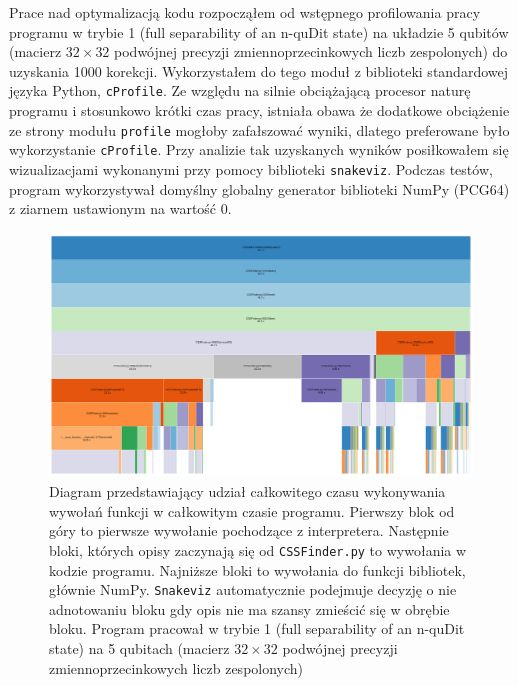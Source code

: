 \documentclass[10pt, a4paper]{article}
\newcommand{\code}[1]{\texttt{#1}}
\begin{document}
\begin{sloppypar}
    Prace nad optymalizacją kodu rozpocząłem od wstępnego profilowania pracy programu w trybie
    1 (full separability of an n-quDit state) na układzie 5 qubitów (macierz
    $32\times 32$ podwójnej precyzji zmiennoprzecinkowych liczb zespolonych) do uzyskania
    1000 korekcji. Wykorzystałem do tego moduł z biblioteki standardowej języka Python, \code{cProfile}.
    Ze względu na silnie obciążającą procesor naturę programu i stosunkowo krótki czas pracy,
    istniała obawa że dodatkowe obciążenie ze strony modułu \code{profile} mogłoby zafałszować
    wyniki, dlatego preferowane było wykorzystanie \code{cProfile}. Przy analizie tak
    uzyskanych wyników posiłkowałem się wizualizacjami wykonanymi przy pomocy biblioteki
    \code{snakeviz}\cite{Snakeviz_PyPI}. Podczas testów, program wykorzystywał domyślny
    globalny generator biblioteki NumPy (PCG64\cite{NumpyDefaultGenerator}) z ziarnem ustawionym
    na wartość 0.

    \FloatBarrier
    \begin{figure}[h]
      \centering
      \includegraphics[width=1.0\textwidth]{"resources/profiling_1/graph.png"}
      \caption{Diagram przedstawiający udział całkowitego czasu wykonywania wywołań funkcji w całkowitym czasie programu. Pierwszy blok od góry to pierwsze wywołanie pochodzące z interpretera. Następnie bloki, których opisy zaczynają się od \code{CSSFinder.py} to wywołania w kodzie programu. Najniższe bloki to wywołania do funkcji bibliotek, głównie NumPy. \code{Snakeviz} automatycznie podejmuje decyzję o nie adnotowaniu bloku gdy opis nie ma szansy zmieścić się w obrębie bloku. Program pracował w trybie 1 (full separability of an n-quDit state) na 5 qubitach (macierz $3
      2\times32$ podwójnej precyzji zmiennoprzecinkowych liczb zespolonych)}
    \end{figure}


\end{sloppypar}
\end{document}
